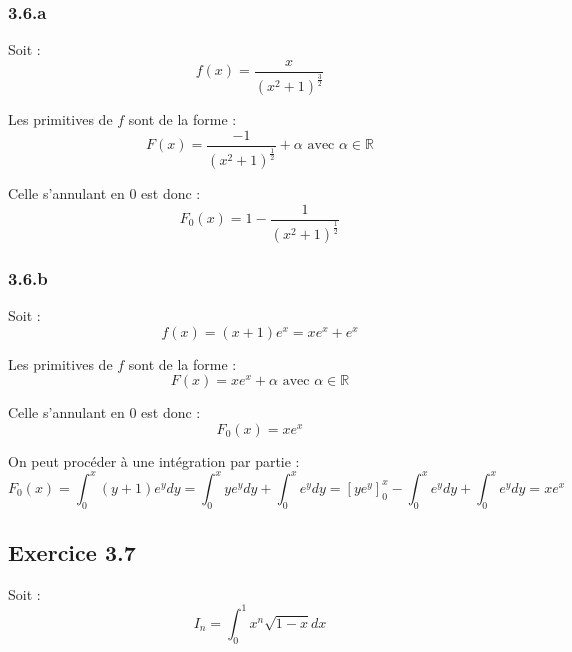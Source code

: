 \documentclass[a4paper,10pt]{report}
\begin{document}
\subsubsection*{3.6.a}

Soit :
\begin{displaymath}
	f(x) = \frac{x}{(x^2+1)^\frac{3}{2}}
\end{displaymath}

Les primitives de $f$ sont de la forme :
\begin{displaymath}
	F(x) = \frac{-1}{(x^2+1)^\frac{1}{2}} + \alpha \text{ avec } \alpha \in \mathbb{R}
\end{displaymath}



Celle s'annulant en $0$ est donc :
\begin{displaymath}
	F_0(x) = 1-\frac{1}{(x^2+1)^\frac{1}{2}}
\end{displaymath}


\subsubsection*{3.6.b}

Soit :
\begin{displaymath}
	f(x) = (x+1)e^x = xe^x +e^x
\end{displaymath}

Les primitives de $f$ sont de la forme :
\begin{displaymath}
	F(x) = xe^x + \alpha \text{ avec } \alpha \in \mathbb{R}
\end{displaymath}

Celle s'annulant en $0$ est donc :
\begin{displaymath}
	F_0(x) = xe^x
\end{displaymath}

On peut procéder à une intégration par partie :
\begin{displaymath}
	F_0(x) = \int_0^x (y+1) e^y dy = \int_0^x ye^y dy + \int_0^x e^y dy = [ye^y]_0^x -\int_0^x e^y dy + \int_0^x e^y dy = xe^x
\end{displaymath}



\subsection*{Exercice 3.7}

Soit :
\begin{displaymath}
	I_n = \int_0^1 x^n\sqrt{1-x} dx
\end{displaymath}
\end{document}
